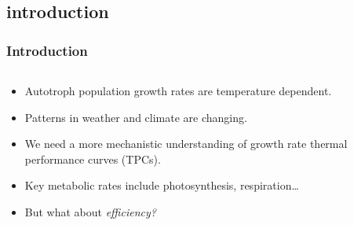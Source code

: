 \documentclass{beamer}
\begin{document}
\subsection{introduction}
\begin{frame}
  \frametitle{Introduction}

  \vspace{-20pt}

  \begin{columns}
    \begin{column}{0.65\textwidth}
      \begin{itemize}
        \item Autotroph population growth rates are temperature dependent.
        \item Patterns in weather and climate are changing.
        \item We need a more mechanistic understanding of growth rate thermal
          performance curves (TPCs).
        \item Key metabolic rates include photosynthesis, respiration\ldots
        \item But what about {\textrm{\textit{efficiency?}}}
      \end{itemize}
    \end{column}
    \begin{column}{0.48\textwidth}
    \end{column}
  \end{columns}


\end{frame}
\end{document}
